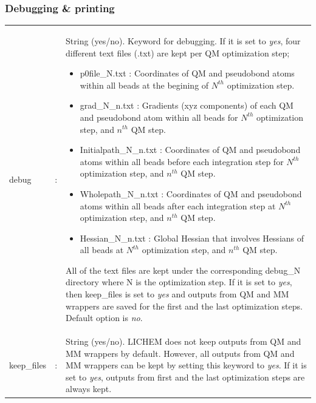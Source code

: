\documentclass[12pt]{report}
\begin{document}
\subsubsection{Debugging \& printing}
\begin{center}
\begin{longtable}[c]{ p{4cm} c p{12.5cm}}
debug & : & 
String (yes/no). 
Keyword for debugging. 
If it is set to \textsl{yes},
four different text files (\*.txt) 
are kept per QM optimization step;\newline

\begin{itemize}
\item p0file\_N.txt : Coordinates of QM and 
pseudobond atoms within all beads at the 
begining of $N^{th}$ optimization step.
\item grad\_N\_n.txt : Gradients (xyz components) 
of each QM and pseudobond atom within all beads 
for $N^{th}$ optimization step, and $n^{th}$ QM step. 
\item Initialpath\_N\_n.txt : Coordinates of QM and 
pseudobond atoms within all beads before each integration 
step for $N^{th}$ optimization step, and $n^{th}$ QM step.
\item Wholepath\_N\_n.txt : Coordinates of QM and 
pseudobond atoms within all beads after each integration 
step at $N^{th}$ optimization step, and $n^{th}$ QM step.
\item Hessian\_N\_n.txt : Global Hessian that involves 
Hessians of all beads 
at $N^{th}$ optimization step, and $n^{th}$ QM step.\newline
\end{itemize} 
All of the text files are kept under 
the corresponding debug\_N directory 
where N is the optimization step.
If it is set to \textsl{yes}, 
then keep\_files 
is set to \textsl{yes} and 
outputs from QM and MM wrappers 
are saved for the first and the last 
optimization steps.
Default option is \textsl{no}.\newline\\

keep\_files & : &   
String (yes/no). 
LICHEM does not keep outputs 
from QM and MM wrappers by default. 
However, all outputs 
from QM and MM wrappers can be 
kept by setting this keyword 
to \textsl{yes}. 
If it is set to \textsl{yes}, 
outputs from first and the last 
optimization steps are 
always kept.\newline \\


\end{longtable}
\end{center}
\end{document}
